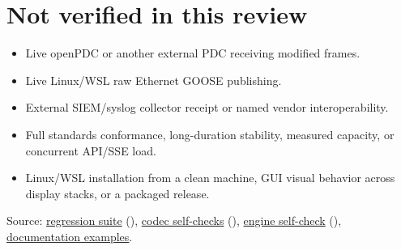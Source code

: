 \section*{Not verified in this review}
\par\noindent\begin{minipage}{\linewidth}\setlength{\parskip}{5pt}
\begin{itemize}
\item Live openPDC or another external PDC receiving modified frames.
\item Live Linux/WSL raw Ethernet GOOSE publishing.
\item External SIEM/syslog collector receipt or named vendor interoperability.
\item Full standards conformance, long-duration stability, measured capacity, or concurrent API/SSE load.
\item Linux/WSL installation from a clean machine, GUI visual behavior across display stacks, or a packaged release.
\end{itemize}
{\footnotesize\color{muted}\raggedright Source: \href{https://github.com/neerajjayesh/GridSec-project/blob/main/test_regression.py}{regression suite} (), \href{https://github.com/neerajjayesh/GridSec-project/blob/main/protocols/c37118.py}{codec self-checks} (), \href{https://github.com/neerajjayesh/GridSec-project/blob/main/core/attack_engine.py}{engine self-check} (), \hyperref[reference-files]{documentation examples}.\par}
\end{minipage}\par

